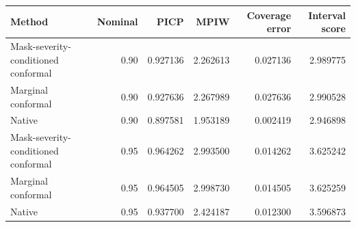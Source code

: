 \begin{tabular}{@{}lrrrrr@{}}
\toprule
Method & Nominal & PICP & MPIW & Coverage error & Interval score \\
\midrule
Mask-severity-conditioned conformal & 0.90 & 0.927136 & 2.262613 & 0.027136 & 2.989775 \\
Marginal conformal & 0.90 & 0.927636 & 2.267989 & 0.027636 & 2.990528 \\
Native & 0.90 & 0.897581 & 1.953189 & 0.002419 & 2.946898 \\
Mask-severity-conditioned conformal & 0.95 & 0.964262 & 2.993500 & 0.014262 & 3.625242 \\
Marginal conformal & 0.95 & 0.964505 & 2.998730 & 0.014505 & 3.625259 \\
Native & 0.95 & 0.937700 & 2.424187 & 0.012300 & 3.596873 \\
\bottomrule
\end{tabular}
